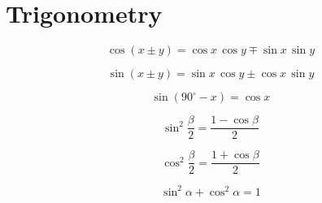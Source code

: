 \section{Trigonometry} \label{sec:trigonometry}
\begin{center}
	\begin{equation} \label{eq:addition_theorem_cos}
		\cos \left(x \pm y\right) = \cos x \, \cos y \mp \sin x \, \sin y
	\end{equation}
\end{center}
\begin{center}
	\begin{equation} \label{eq:addition_theorem_sin}
		\sin \left(x \pm y\right) = \sin x \, \cos y \pm \cos x \, \sin y
	\end{equation}
\end{center}
\begin{center}
	\begin{equation} \label{eq:reduction_formula}
		\sin \left(90^\circ - x \right) = \cos x
	\end{equation}
\end{center}
\begin{center}
	\begin{equation} \label{eq:sin_squared}
		\sin^2 \frac{\beta}{2} = \frac{1 - \cos \beta}{2}
	\end{equation}
\end{center}
\begin{center}
	\begin{equation} \label{eq:cos_squared}
		\cos^2 \frac{\beta}{2} = \frac{1 + \cos \beta}{2}
	\end{equation}
\end{center}
\begin{center}
	\begin{equation} \label{eq:cos_squared_sin_squared}
		\sin^2 \alpha + \cos^2 \alpha = 1
	\end{equation}
\end{center}